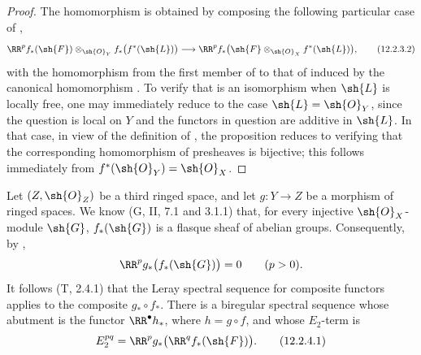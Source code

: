 \begin{proof}
The homomorphism  is obtained by composing the
following particular case of ,
\[
  \RR^p f_*(\sh{F})
    \otimes_{\sh{O}_Y}f_*\bigl(f^*(\sh{L})\bigr)
  \longrightarrow
  \RR^p f_*
    \bigl(\sh{F}\otimes_{\sh{O}_X}f^*(\sh{L})\bigr),
  \tag{12.2.3.2}
  \label{0.12.2.3.2}
\]
with the homomorphism from the first member of
 to that of  induced by the
canonical homomorphism .
To verify that  is an isomorphism when $\sh{L}$ is
locally free, one may immediately reduce to the case
$\sh{L}=\sh{O}_Y$, since the question is local on $Y$ and the
functors in question are additive in $\sh{L}$.
In that case, in view of the definition of , the
proposition reduces to verifying that the corresponding homomorphism
of presheaves is bijective; this follows immediately from
$f^*(\sh{O}_Y)=\sh{O}_X$.
\end{proof}

\begin{env}[12.2.4]
\label{0.12.2.4}
Let $(Z,\sh{O}_Z)$ be a third ringed space, and let
$g:Y\to Z$ be a morphism of ringed spaces.
We know (G, II, 7.1 and 3.1.1) that, for every injective
$\sh{O}_X$-module $\sh{G}$, $f_*(\sh{G})$ is a flasque sheaf of
abelian groups.  Consequently, by ,
\[
  \RR^p g_*\bigl(f_*(\sh{G})\bigr)=0
  \qquad(p>0).
\]
It follows (T, 2.4.1) that the Leray spectral sequence for composite
functors applies to the composite $g_*\circ f_*$.  There is a
biregular spectral sequence whose abutment is the functor
$\RR^\bullet h_*$, where $h=g\circ f$, and whose $E_2$-term is
\[
  E_2^{pq}=\RR^p g_*\bigl(\RR^q f_*(\sh{F})\bigr).
  \tag{12.2.4.1}
  \label{0.12.2.4.1}
\]
\end{env}

